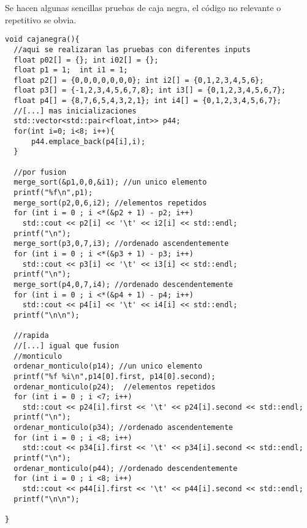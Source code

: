 Se hacen algunas sencillas pruebas de caja negra, el código no relevante o repetitivo se obvia.

\begin{lstlisting}
void cajanegra(){
  //aqui se realizaran las pruebas con diferentes inputs
  float p02[] = {}; int i02[] = {};
  float p1 = 1;  int i1 = 1; 
  float p2[] = {0,0,0,0,0,0,0}; int i2[] = {0,1,2,3,4,5,6};
  float p3[] = {-1,2,3,4,5,6,7,8}; int i3[] = {0,1,2,3,4,5,6,7}; 
  float p4[] = {8,7,6,5,4,3,2,1}; int i4[] = {0,1,2,3,4,5,6,7}; 
  //[...] mas inicializaciones 
  std::vector<std::pair<float,int>> p44;
  for(int i=0; i<8; i++){
      p44.emplace_back(p4[i],i);
  }

  //por fusion
  merge_sort(&p1,0,0,&i1); //un unico elemento
  printf("%f\n",p1);
  merge_sort(p2,0,6,i2); //elementos repetidos
  for (int i = 0 ; i <*(&p2 + 1) - p2; i++) 
    std::cout << p2[i] << '\t' << i2[i] << std::endl;
  printf("\n");
  merge_sort(p3,0,7,i3); //ordenado ascendentemente
  for (int i = 0 ; i <*(&p3 + 1) - p3; i++) 
    std::cout << p3[i] << '\t' << i3[i] << std::endl;
  printf("\n");
  merge_sort(p4,0,7,i4); //ordenado descendentemente
  for (int i = 0 ; i <*(&p4 + 1) - p4; i++) 
    std::cout << p4[i] << '\t' << i4[i] << std::endl;
  printf("\n\n");

  //rapida
  //[...] igual que fusion
  //monticulo
  ordenar_monticulo(p14); //un unico elemento
  printf("%f %i\n",p14[0].first, p14[0].second);
  ordenar_monticulo(p24);  //elementos repetidos
  for (int i = 0 ; i <7; i++) 
    std::cout << p24[i].first << '\t' << p24[i].second << std::endl;
  printf("\n");
  ordenar_monticulo(p34); //ordenado ascendentemente
  for (int i = 0 ; i <8; i++) 
    std::cout << p34[i].first << '\t' << p34[i].second << std::endl;
  printf("\n");
  ordenar_monticulo(p44); //ordenado descendentemente
  for (int i = 0 ; i <8; i++) 
    std::cout << p44[i].first << '\t' << p44[i].second << std::endl;
  printf("\n\n");

}
\end{lstlisting}

\vspace{5mm}
